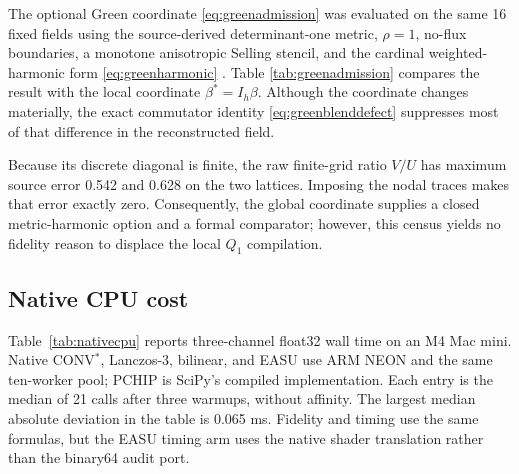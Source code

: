 \documentclass[journal]{IEEEtran}
\begin{document}
The optional Green coordinate \eqref{eq:greenadmission} was evaluated on the
same 16 fixed fields using the source-derived determinant-one metric,
\(\rho=1\), no-flux boundaries, a monotone anisotropic Selling stencil, and
the cardinal weighted-harmonic form \eqref{eq:greenharmonic}
\cite{mirebeau2014}. Table
\ref{tab:greenadmission} compares the result with the local coordinate
\(\beta^*=I_h\beta\). Although the coordinate changes materially, the exact
commutator identity \eqref{eq:greenblenddefect} suppresses most of that
difference in the reconstructed field.

\begin{table}[H]
\caption{Cardinal Green admission versus local \(Q_1\) compilation}
\label{tab:greenadmission}
\centering
\scriptsize
\setlength{\tabcolsep}{2.2pt}
\end{table}

Because its discrete diagonal is finite, the raw finite-grid ratio \(V/U\)
has maximum source error 0.542 and 0.628 on the two lattices. Imposing the
nodal traces makes that error exactly zero. Consequently, the global
coordinate supplies a closed metric-harmonic option and a formal comparator;
however, this census yields no fidelity reason to displace the local \(Q_1\)
compilation.

\subsection{Native CPU cost}

Table~\ref{tab:nativecpu} reports three-channel float32 wall time on an M4
Mac mini. Native CONV$^{*}$, Lanczos-3, bilinear, and EASU use ARM
NEON and the same ten-worker pool; PCHIP is SciPy's compiled implementation.
Each entry is the median of 21 calls after three warmups, without affinity.
The largest median absolute deviation in the table is 0.065 ms. Fidelity and
timing use the same formulas, but the EASU timing arm uses the native shader
translation rather than the binary64 audit port.
\end{document}
